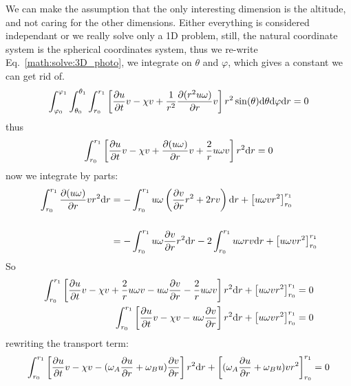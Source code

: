 We can make the assumption that the only interesting dimension is the altitude, and
not caring for the other dimensions. Either everything
is considered independant or we really solve only a 1D problem, still,
the natural coordinate system is the spherical
coordinates system, thus we re-write Eq.~\ref{math:solve:3D_photo}, 
we integrate on $\theta$ and $\varphi$,
which gives a constant we can get rid of.
\begin{equation}
\int_{\varphi_0}^{\varphi_1}\int_{\theta_0}^{\theta_1}\int_{r_0}^{r_1}\left[   \frac{\partial u}{\partial t} v 
                       - \chi v + \frac{1}{r^2}\frac{\partial(r^2u\omega)}{\partial r} v
                \right] r^2\sin(\theta)\mathrm{d}\theta\mathrm{d}\varphi\mathrm{d} r = 0
\end{equation}
thus
\begin{equation}
\int_{r_0}^{r_1}\left[   \frac{\partial u}{\partial t} v 
                       - \chi v + \frac{\partial(u\omega)}{\partial r} v
                       + \frac{2}{r}u\omega v
                \right] r^2\mathrm{d} r = 0
\end{equation}
now we integrate by parts:
\begin{equation}
\begin{split}
\int_{r_0}^{r_1}\frac{\partial(u\omega)}{\partial r} v r^2 \mathrm{d} r 
   & = - \int_{r_0}^{r_1}u\omega \left(\frac{\partial v}{\partial r}r^2 + 2 r v\right) \mathrm{d} r + \left[u\omega v r^2\right]_{r_0}^{r_1}
        \\[\baselineskip]
   & = - \int_{r_0}^{r_1}u\omega \frac{\partial v}{\partial r} r^2  \mathrm{d} r - 2 \int_{r_0}^{r_1}u\omega  r v \mathrm{d} r  + \left[u\omega v r^2\right]_{r_0}^{r_1}
\end{split}
\end{equation}
So
\begin{equation}
\begin{split}
\int_{r_0}^{r_1} \left[   \frac{\partial u}{\partial t} v 
                        - \chi v
                        + \frac{2}{r} u\omega v
                        - u\omega\frac{\partial v}{\partial r}
                        - \frac{2}{r} u\omega v
                 \right] r^2 \mathrm{d} r 
     + \left[u\omega v r^2\right]_{r_0}^{r_1}   & = 0 \\
\int_{r_0}^{r_1} \left[   \frac{\partial u}{\partial t} v 
                        - \chi v
                        - u\omega\frac{\partial v}{\partial r}
                 \right] r^2 \mathrm{d} r 
     + \left[u\omega v r^2\right]_{r_0}^{r_1}   & = 0 
\end{split}
\end{equation}
rewriting the transport term:
\begin{equation}
\int_{r_0}^{r_1} \left[   \frac{\partial u}{\partial t} v 
                        - \chi v
                        - (\omega_A \frac{\partial u}{\partial r} + \omega_B u )\frac{\partial v}{\partial r}
                 \right] r^2 \mathrm{d} r 
     + \left[(\omega_A \frac{\partial u}{\partial r} + \omega_B u) v r^2\right]_{r_0}^{r_1}  = 0 
\end{equation}

